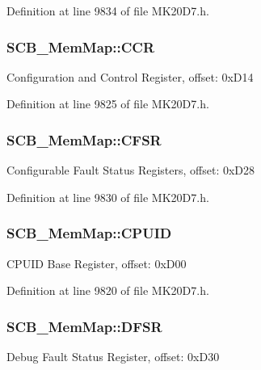 Definition at line 9834 of file M\+K20\+D7.\+h.

\subsubsection[{\texorpdfstring{C\+CR}{CCR}}]{ S\+C\+B\+\_\+\+Mem\+Map\+::\+C\+CR}\hypertarget{struct_s_c_b___mem_map_aa6e957027d8c505047cd58101bb784aa}{}\label{struct_s_c_b___mem_map_aa6e957027d8c505047cd58101bb784aa}
Configuration and Control Register, offset\+: 0x\+D14 

Definition at line 9825 of file M\+K20\+D7.\+h.

\subsubsection[{\texorpdfstring{C\+F\+SR}{CFSR}}]{ S\+C\+B\+\_\+\+Mem\+Map\+::\+C\+F\+SR}\hypertarget{struct_s_c_b___mem_map_a51c6a21cb789c655257efe5796c7f503}{}\label{struct_s_c_b___mem_map_a51c6a21cb789c655257efe5796c7f503}
Configurable Fault Status Registers, offset\+: 0x\+D28 

Definition at line 9830 of file M\+K20\+D7.\+h.

\subsubsection[{\texorpdfstring{C\+P\+U\+ID}{CPUID}}]{ S\+C\+B\+\_\+\+Mem\+Map\+::\+C\+P\+U\+ID}\hypertarget{struct_s_c_b___mem_map_ad020795dcc3605b4c828af83df8b8836}{}\label{struct_s_c_b___mem_map_ad020795dcc3605b4c828af83df8b8836}
C\+P\+U\+ID Base Register, offset\+: 0x\+D00 

Definition at line 9820 of file M\+K20\+D7.\+h.

\subsubsection[{\texorpdfstring{D\+F\+SR}{DFSR}}]{ S\+C\+B\+\_\+\+Mem\+Map\+::\+D\+F\+SR}\hypertarget{struct_s_c_b___mem_map_af178d6003a18eb7452c51edcec14ec5d}{}\label{struct_s_c_b___mem_map_af178d6003a18eb7452c51edcec14ec5d}
Debug Fault Status Register, offset\+: 0x\+D30 

